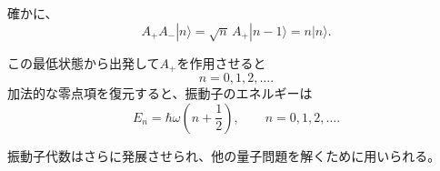 確かに、
\begin{equation}
A_+A_-|n\rangle
=\sqrt n\,A_+|n-1\rangle
=n|n\rangle.
\end{equation}

\begin{classroomqa}
\end{classroomqa}


この最低状態から出発して\(A_+\)を作用させると
\begin{equation}
n=0,1,2,\ldots.
\end{equation}
加法的な零点項を復元すると、振動子のエネルギーは
\begin{equation}
E_n=\hbar\omega\left(n+\frac{1}{2}\right),
\qquad n=0,1,2,\ldots.
\end{equation}

振動子代数はさらに発展させられ、他の量子問題を解くために用いられる。
